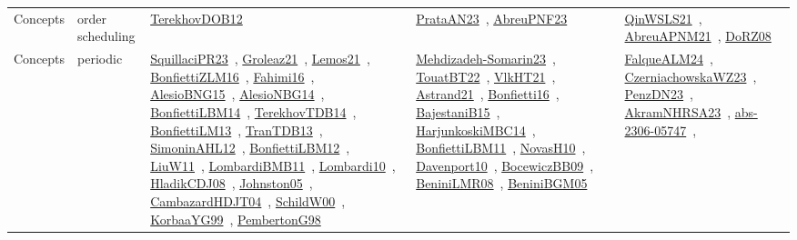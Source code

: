 {\begin{longtable}{lp{3cm}>{\raggedright\arraybackslash}p{6cm}>{\raggedright\arraybackslash}p{6cm}>{\raggedright\arraybackslash}p{8cm}}
Concepts & order scheduling & \href{../works/TerekhovDOB12.pdf}{TerekhovDOB12}~\cite{TerekhovDOB12} & \href{../works/PrataAN23.pdf}{PrataAN23}~\cite{PrataAN23}, \href{../works/AbreuPNF23.pdf}{AbreuPNF23}~\cite{AbreuPNF23} & \href{../works/QinWSLS21.pdf}{QinWSLS21}~\cite{QinWSLS21}, \href{../works/AbreuAPNM21.pdf}{AbreuAPNM21}~\cite{AbreuAPNM21}, \href{../works/DoRZ08.pdf}{DoRZ08}~\cite{DoRZ08}\\
Concepts & periodic & \href{../works/SquillaciPR23.pdf}{SquillaciPR23}~\cite{SquillaciPR23}, \href{../works/Groleaz21.pdf}{Groleaz21}~\cite{Groleaz21}, \href{../works/Lemos21.pdf}{Lemos21}~\cite{Lemos21}, \href{../works/BonfiettiZLM16.pdf}{BonfiettiZLM16}~\cite{BonfiettiZLM16}, \href{../works/Fahimi16.pdf}{Fahimi16}~\cite{Fahimi16}, \href{../works/AlesioBNG15.pdf}{AlesioBNG15}~\cite{AlesioBNG15}, \href{../works/AlesioNBG14.pdf}{AlesioNBG14}~\cite{AlesioNBG14}, \href{../works/BonfiettiLBM14.pdf}{BonfiettiLBM14}~\cite{BonfiettiLBM14}, \href{../works/TerekhovTDB14.pdf}{TerekhovTDB14}~\cite{TerekhovTDB14}, \href{../works/BonfiettiLM13.pdf}{BonfiettiLM13}~\cite{BonfiettiLM13}, \href{../works/TranTDB13.pdf}{TranTDB13}~\cite{TranTDB13}, \href{../works/SimoninAHL12.pdf}{SimoninAHL12}~\cite{SimoninAHL12}, \href{../works/BonfiettiLBM12.pdf}{BonfiettiLBM12}~\cite{BonfiettiLBM12}, \href{../works/LiuW11.pdf}{LiuW11}~\cite{LiuW11}, \href{../works/LombardiBMB11.pdf}{LombardiBMB11}~\cite{LombardiBMB11}, \href{../works/Lombardi10.pdf}{Lombardi10}~\cite{Lombardi10}, \href{../works/HladikCDJ08.pdf}{HladikCDJ08}~\cite{HladikCDJ08}, \href{../works/Johnston05.pdf}{Johnston05}~\cite{Johnston05}, \href{../works/CambazardHDJT04.pdf}{CambazardHDJT04}~\cite{CambazardHDJT04}, \href{../works/SchildW00.pdf}{SchildW00}~\cite{SchildW00}, \href{../works/KorbaaYG99.pdf}{KorbaaYG99}~\cite{KorbaaYG99}, \href{../works/PembertonG98.pdf}{PembertonG98}~\cite{PembertonG98} & \href{../works/Mehdizadeh-Somarin23.pdf}{Mehdizadeh-Somarin23}~\cite{Mehdizadeh-Somarin23}, \href{../works/TouatBT22.pdf}{TouatBT22}~\cite{TouatBT22}, \href{../works/VlkHT21.pdf}{VlkHT21}~\cite{VlkHT21}, \href{../works/Astrand21.pdf}{Astrand21}~\cite{Astrand21}, \href{../works/Bonfietti16.pdf}{Bonfietti16}~\cite{Bonfietti16}, \href{../works/BajestaniB15.pdf}{BajestaniB15}~\cite{BajestaniB15}, \href{../works/HarjunkoskiMBC14.pdf}{HarjunkoskiMBC14}~\cite{HarjunkoskiMBC14}, \href{../works/BonfiettiLBM11.pdf}{BonfiettiLBM11}~\cite{BonfiettiLBM11}, \href{../works/NovasH10.pdf}{NovasH10}~\cite{NovasH10}, \href{../works/Davenport10.pdf}{Davenport10}~\cite{Davenport10}, \href{../works/BocewiczBB09.pdf}{BocewiczBB09}~\cite{BocewiczBB09}, \href{../works/BeniniLMR08.pdf}{BeniniLMR08}~\cite{BeniniLMR08}, \href{../works/BeniniBGM05.pdf}{BeniniBGM05}~\cite{BeniniBGM05} & \href{../works/FalqueALM24.pdf}{FalqueALM24}~\cite{FalqueALM24}, \href{../works/CzerniachowskaWZ23.pdf}{CzerniachowskaWZ23}~\cite{CzerniachowskaWZ23}, \href{../works/PenzDN23.pdf}{PenzDN23}~\cite{PenzDN23}, \href{../works/AkramNHRSA23.pdf}{AkramNHRSA23}~\cite{AkramNHRSA23}, \href{../works/abs-2306-05747.pdf}{abs-2306-05747}~\cite{abs-2306-05747}, 
\end{longtable}}
